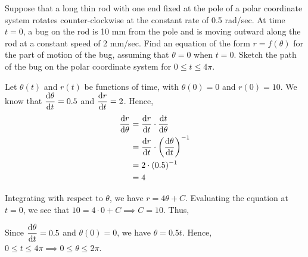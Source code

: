\documentclass{echw}
\begin{document}
    \problem{}
        Suppose that a long thin rod with one end fixed at the pole of a polar coordinate system rotates counter-clockwise at the constant rate of 0.5 rad/sec. At time $t = 0$, a bug on the rod is 10 mm from the pole and is moving outward along the rod at a constant speed of 2 mm/sec. Find an equation of the form $r = f(\theta)$ for the part of motion of the bug, assuming that $\theta = 0$ when $t = 0$. Sketch the path of the bug on the polar coordinate system for $0 \leq t \leq 4\pi$.

    \solution
        Let $\theta(t)$ and $r(t)$ be functions of time, with $\theta(0) = 0$ and $r(0) = 10$. We know that $\dfrac{\mathrm{d} \theta}{\mathrm{d} t} = 0.5$ and $\dfrac{\mathrm{d} r}{\mathrm{d} t} = 2$. Hence,
        \begin{align*}
            \dfrac{\mathrm{d} r}{\mathrm{d} \theta} &= \dfrac{\mathrm{d} r}{\mathrm{d} t} \cdot \dfrac{\mathrm{d} t}{\mathrm{d} \theta} \\
            &= \dfrac{\mathrm{d} r}{\mathrm{d} t} \cdot \left(\dfrac{\mathrm{d} \theta}{\mathrm{d} t}\right)^{-1}\\
            &= 2 \cdot (0.5)^{-1}\\
            &= 4
        \end{align*}

        Integrating with respect to $\theta$, we have $r = 4\theta + C$. Evaluating the equation at $t=0$, we see that $10 = 4\cdot 0 + C \implies C = 10$. Thus,


        Since $\dfrac{\mathrm{d} \theta}{\mathrm{d} t} = 0.5$ and $\theta(0) = 0$, we have $\theta = 0.5t$. Hence, $0 \leq t \leq 4\pi \implies 0 \leq \theta \leq 2\pi$.

        \begin{center}
        \end{center}
\end{document}
